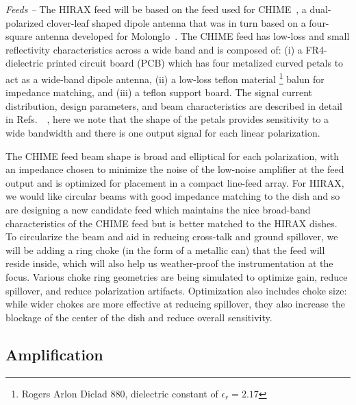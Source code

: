 \documentclass[]{spie}  %
\begin{document}
\textit{Feeds -- } The HIRAX feed will be based on the feed used for CHIME~\cite{6887670}, a dual-polarized clover-leaf shaped dipole antenna that was in turn based on a four-square antenna developed for Molonglo~\cite{Martin2008}. The CHIME feed has low-loss and small reflectivity characteristics across a wide band and is composed of: (i) a FR4-dielectric printed circuit board (PCB) which has four metalized curved petals to act as a wide-band dipole antenna, (ii) a low-loss teflon material \footnote{Rogers Arlon Diclad 880, dielectric constant of $\epsilon_{r} = 2.17$} balun for impedance matching, and (iii) a teflon support board. The signal current distribution, design parameters, and beam characteristics are described in detail in Refs.~\cite{2014SPIE.9145E..22B}~\cite{6887670}, here we note that the shape of the petals provides sensitivity to a wide bandwidth and there is one output signal for each linear polarization. \newline

The CHIME feed beam shape is broad and elliptical for each polarization, with an impedance chosen to minimize the noise of the low-noise amplifier at the feed output and is optimized for placement in a compact line-feed array. For HIRAX, we would like circular beams with good impedance matching to the dish and so are designing a new candidate feed which maintains the nice broad-band characteristics of the CHIME feed but is better matched to the HIRAX dishes. To circularize the beam and aid in reducing cross-talk and ground spillover, we will be adding a ring choke (in the form of a metallic can) that the feed will reside inside, which will also help us weather-proof the instrumentation at the focus. Various choke ring geometries are being simulated to optimize gain, reduce spillover, and reduce polarization artifacts. Optimization also includes choke size: while wider chokes are more effective at reducing spillover, they also increase the blockage of the center of the dish and reduce overall sensitivity. \newline


\subsection{Amplification}
\end{document}
